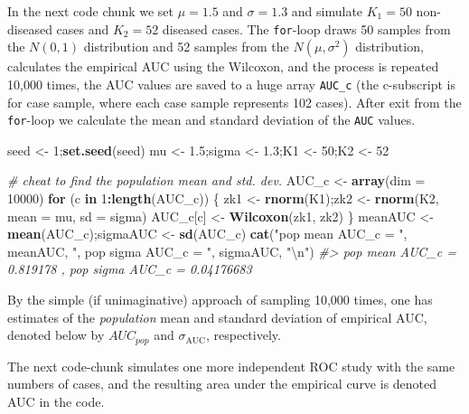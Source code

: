 \documentclass[
]{book}
\newenvironment{Shaded}{\begin{snugshade}}{\end{snugshade}}
\newcommand{\CharTok}[1]{\textcolor[rgb]{0.31,0.60,0.02}{#1}}
\newcommand{\CommentTok}[1]{\textcolor[rgb]{0.56,0.35,0.01}{\textit{#1}}}
\newcommand{\ControlFlowTok}[1]{\textcolor[rgb]{0.13,0.29,0.53}{\textbf{#1}}}
\newcommand{\DataTypeTok}[1]{\textcolor[rgb]{0.13,0.29,0.53}{#1}}
\newcommand{\DecValTok}[1]{\textcolor[rgb]{0.00,0.00,0.81}{#1}}
\newcommand{\FloatTok}[1]{\textcolor[rgb]{0.00,0.00,0.81}{#1}}
\newcommand{\KeywordTok}[1]{\textcolor[rgb]{0.13,0.29,0.53}{\textbf{#1}}}
\newcommand{\NormalTok}[1]{#1}
\newcommand{\OperatorTok}[1]{\textcolor[rgb]{0.81,0.36,0.00}{\textbf{#1}}}
\newcommand{\StringTok}[1]{\textcolor[rgb]{0.31,0.60,0.02}{#1}}
\begin{document}
In the next code chunk we set \(\mu = 1.5\) and \(\sigma = 1.3\) and simulate \(K_1 = 50\) non-diseased cases and \(K_2 = 52\) diseased cases. The \texttt{for}-loop draws 50 samples from the \(N(0,1)\) distribution and 52 samples from the \(N(\mu,\sigma^2)\) distribution, calculates the empirical AUC using the Wilcoxon, and the process is repeated 10,000 times, the AUC values are saved to a huge array \texttt{AUC\_c} (the c-subscript is for case sample, where each case sample represents 102 cases). After exit from the \texttt{for}-loop we calculate the mean and standard deviation of the \texttt{AUC} values.

\begin{Shaded}
\begin{Highlighting}[]
\NormalTok{seed <-}\StringTok{ }\DecValTok{1}\NormalTok{;}\KeywordTok{set.seed}\NormalTok{(seed)}
\NormalTok{mu <-}\StringTok{ }\FloatTok{1.5}\NormalTok{;sigma <-}\StringTok{ }\FloatTok{1.3}\NormalTok{;K1 <-}\StringTok{ }\DecValTok{50}\NormalTok{;K2 <-}\StringTok{ }\DecValTok{52}

\CommentTok{# cheat to find the population mean and std. dev.}
\NormalTok{AUC_c <-}\StringTok{ }\KeywordTok{array}\NormalTok{(}\DataTypeTok{dim =} \DecValTok{10000}\NormalTok{)}
\ControlFlowTok{for}\NormalTok{ (c }\ControlFlowTok{in} \DecValTok{1}\OperatorTok{:}\KeywordTok{length}\NormalTok{(AUC_c)) \{}
\NormalTok{  zk1 <-}\StringTok{ }\KeywordTok{rnorm}\NormalTok{(K1);zk2 <-}\StringTok{ }\KeywordTok{rnorm}\NormalTok{(K2, }\DataTypeTok{mean =}\NormalTok{ mu, }\DataTypeTok{sd =}\NormalTok{ sigma)  }
\NormalTok{  AUC_c[c] <-}\StringTok{ }\KeywordTok{Wilcoxon}\NormalTok{(zk1, zk2)}
\NormalTok{\}}
\NormalTok{meanAUC   <-}\StringTok{  }\KeywordTok{mean}\NormalTok{(AUC_c);sigmaAUC  <-}\StringTok{  }\KeywordTok{sd}\NormalTok{(AUC_c)}
\KeywordTok{cat}\NormalTok{(}\StringTok{"pop mean AUC_c = "}\NormalTok{, meanAUC, }
    \StringTok{", pop sigma AUC_c = "}\NormalTok{, sigmaAUC, }\StringTok{"}\CharTok{\textbackslash{}n}\StringTok{"}\NormalTok{)}
\CommentTok{#> pop mean AUC_c =  0.819178 , pop sigma AUC_c =  0.04176683}
\end{Highlighting}
\end{Shaded}

By the simple (if unimaginative) approach of sampling 10,000 times, one has estimates of the \emph{population} mean and standard deviation of empirical AUC, denoted below by \(AUC_{pop}\) and \(\sigma_{\text{AUC}}\), respectively.

The next code-chunk simulates one more independent ROC study with the same numbers of cases, and the resulting area under the empirical curve is denoted AUC in the code.
\end{document}

